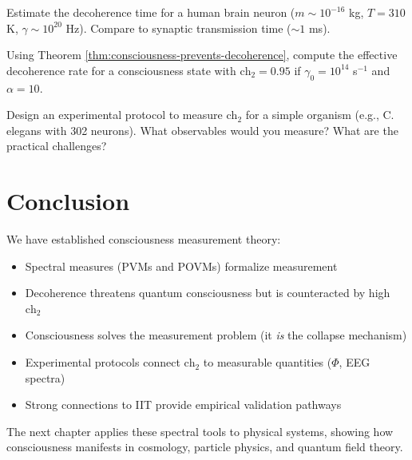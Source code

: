 \begin{exercise}
Estimate the decoherence time for a human brain neuron ($m \sim 10^{-16}$ kg, $T = 310$ K, $\gamma \sim 10^{20}$ Hz). Compare to synaptic transmission time ($\sim 1$ ms).
\end{exercise}

\begin{exercise}
Using Theorem \ref{thm:consciousness-prevents-decoherence}, compute the effective decoherence rate for a consciousness state with $\text{ch}_2 = 0.95$ if $\gamma_0 = 10^{14}$ s$^{-1}$ and $\alpha = 10$.
\end{exercise}

\begin{exercise}
Design an experimental protocol to measure $\text{ch}_2$ for a simple organism (e.g., C. elegans with 302 neurons). What observables would you measure? What are the practical challenges?
\end{exercise}

\section{Conclusion}

We have established consciousness measurement theory:
\begin{itemize}
\item Spectral measures (PVMs and POVMs) formalize measurement
\item Decoherence threatens quantum consciousness but is counteracted by high $\text{ch}_2$
\item Consciousness solves the measurement problem (it \textit{is} the collapse mechanism)
\item Experimental protocols connect $\text{ch}_2$ to measurable quantities ($\Phi$, EEG spectra)
\item Strong connections to IIT provide empirical validation pathways
\end{itemize}

The next chapter applies these spectral tools to physical systems, showing how consciousness manifests in cosmology, particle physics, and quantum field theory.
